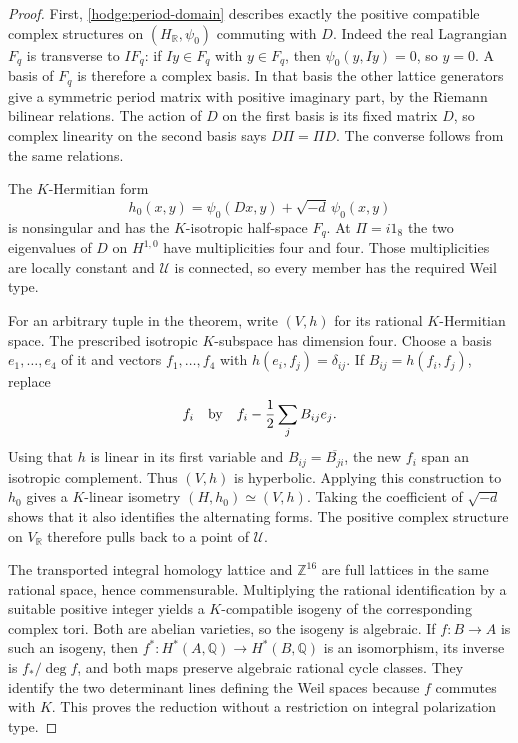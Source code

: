 \documentclass[11pt]{article}
\theoremstyle{definition}
\theoremstyle{remark}
\numberwithin{equation}{section}
\begin{document}
\begin{proof}
First, \eqref{hodge:period-domain} describes exactly the positive compatible
complex structures on $(H_\mathbb R,\psi_0)$ commuting with $D$.  Indeed the real
Lagrangian $F_q$ is transverse to $I F_q$: if $Iy\in F_q$ with
$y\in F_q$, then $\psi_0(y,Iy)=0$, so $y=0$.  A basis of $F_q$ is
therefore a complex basis.  In that basis the other lattice generators
give a symmetric period matrix with positive imaginary part, by the
Riemann bilinear relations.  The action of $D$ on the first basis is its
fixed matrix $D$, so complex linearity on the second basis says
$D\Pi=\Pi D$.  The converse follows from the same relations.

The $K$-Hermitian form
\[
 h_0(x,y)=\psi_0(Dx,y)+\sqrt{-d}\,\psi_0(x,y)
\]
is nonsingular and has the $K$-isotropic half-space $F_q$.  At $\Pi=i1_8$
the two eigenvalues of $D$ on $H^{1,0}$ have multiplicities four and four.
Those multiplicities are locally constant and $\mathcal U$ is connected,
so every member has the required Weil type.

For an arbitrary tuple in the theorem, write $(V,h)$ for its rational
$K$-Hermitian space.  The prescribed isotropic $K$-subspace has dimension
four.  Choose a basis $e_1,\ldots,e_4$ of it and vectors
$f_1,\ldots,f_4$ with $h(e_i,f_j)=\delta_{ij}$.
If $B_{ij}=h(f_i,f_j)$, replace
\[
 f_i\quad\hbox{by}\quad
 f_i-\frac12\sum_j B_{ij}e_j.
\]
Using that $h$ is linear in its first variable and
$B_{ij}=\overline{B_{ji}}$, the new $f_i$ span an isotropic complement.
Thus $(V,h)$ is hyperbolic.  Applying this construction to $h_0$ gives a
$K$-linear isometry $(H,h_0)\simeq(V,h)$.  Taking the coefficient of
$\sqrt{-d}$ shows that it also identifies the alternating forms.
The positive complex structure on $V_\mathbb R$ therefore pulls back to a
point of $\mathcal U$.

The transported integral homology lattice and $\mathbb Z^{16}$ are full lattices
in the same rational space, hence commensurable.  Multiplying the rational
identification by a suitable positive integer yields a $K$-compatible
isogeny of the corresponding complex tori.  Both are abelian varieties,
so the isogeny is algebraic.  If $f:B\to A$ is such an isogeny, then
$f^*:H^*(A,\mathbb Q)\to H^*(B,\mathbb Q)$ is an isomorphism, its inverse is
$f_*/\deg f$, and both maps preserve algebraic rational cycle classes.
They identify the two determinant lines defining the Weil spaces because
$f$ commutes with $K$.  This proves the reduction without a restriction
on integral polarization type.
\end{proof}
\end{document}
